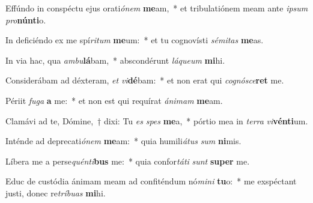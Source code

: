 \item Effúndo in conspéctu ejus orati\textit{ó}\textit{nem} \textbf{me}am,~* et tribulatiónem meam ante \textit{ip}\textit{sum} \textit{pro}\textbf{nún}\textbf{ti}o.
\item In deficiéndo ex me spí\textit{ri}\textit{tum} \textbf{me}um:~* et tu cognovísti \textit{sé}\textit{mi}\textit{tas} \textbf{me}as.
\item In via hac, qua \textit{am}\textit{bu}\textbf{lá}bam,~* abscondérunt \textit{lá}\textit{que}\textit{um} \textbf{mi}hi.
\item Considerábam ad déxteram, \textit{et} \textit{vi}\textbf{dé}bam:~* et non erat qui \textit{co}\textit{gnó}\textit{sce}\textbf{ret} me.
\item Périit \textit{fu}\textit{ga} \textbf{a} me:~* et non est qui requírat \textit{á}\textit{ni}\textit{mam} \textbf{me}am.
\item Clamávi ad te, Dómine,~† dixi: Tu \textit{es} \textit{spes} \textbf{me}a,~* pórtio mea in \textit{ter}\textit{ra} \textit{vi}\textbf{vén}\textbf{ti}um.
\item Inténde ad deprecati\textit{ó}\textit{nem} \textbf{me}am:~* quia humili\textit{á}\textit{tus} \textit{sum} \textbf{ni}mis.
\item Líbera me a perse\textit{quén}\textit{ti}\textbf{bus} me:~* quia confor\textit{tá}\textit{ti} \textit{sunt} \textbf{su}\textbf{per} me.
\item Educ de custódia ánimam meam ad confiténdum nó\textit{mi}\textit{ni} \textbf{tu}o:~* me exspéctant justi, donec re\textit{trí}\textit{bu}\textit{as} \textbf{mi}hi.
